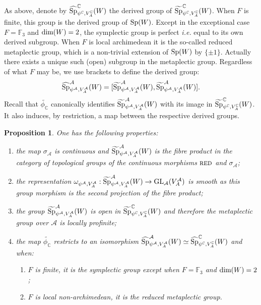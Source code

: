 \documentclass[11pt]{article}
\theoremstyle{plain}
\newtheorem{prop}[theo]{Proposition}
\theoremstyle{definition}
\theoremstyle{plain}
\theoremstyle{definition}
\theoremstyle{plain}
\begin{document}
As above, denote by $\widehat{\textup{Sp}}_{\psi^\mathbb{C},V_A^\mathbb{C}}^\mathbb{C}(W)$ the derived group of $\widetilde{\textup{Sp}}_{\psi^\mathbb{C},V_A^\mathbb{C}}^\mathbb{C}(W)$. When $F$ is finite, this group is the derived group of $\textup{Sp}(W)$. Except in the exceptional case $F=\mathbb{F}_3$ and $\textup{dim} (W)=2$, the symplectic group is perfect \textit{i.e.} equal to its own derived subgroup. When $F$ is local archimedean it is the so-called reduced metaplectic group, which is a non-trivial extension of $\textup{Sp}(W)$ by $\{ \pm 1 \}$. Actually there exists a unique such (open) subgroup in the metaplectic group. Regardless of what $F$ may be, we use brackets to define the derived group:
$$\widehat{\textup{Sp}}_{\psi^\mathcal{A},V_A^\mathcal{A}}^\mathcal{A}(W) = [\widetilde{\textup{Sp}}_{\psi^\mathcal{A},V_A^\mathcal{A}}^\mathcal{A}(W),\widetilde{\textup{Sp}}_{\psi^\mathcal{A},V_A^\mathcal{A}}^\mathcal{A}(W)].$$
Recall that $\widetilde{\phi_\mathbb{C}}$ canonically identifies $\widetilde{\textup{Sp}}_{\psi^\mathcal{A},V_A^\mathcal{A}}^\mathcal{A}(W)$ with its image in $\widetilde{\textup{Sp}}_{\psi^\mathbb{C},V_A^\mathbb{C}}^\mathbb{C}(W)$. It also induces, by restriction, a map between the respective derived groups.

\begin{prop} \label{metaplectic_group_over_A_prop} One has the following properties:
\begin{enumerate}[label=\textup{\alph*)}]
\item the map $\sigma_\mathcal{A}$ is continuous and $\widetilde{\textup{Sp}}_{\psi^\mathcal{A},V_A^\mathcal{A}}^\mathcal{A}(W)$ is the fibre product in the category of topological groups of the continuous morphisms $\textup{\textsc{red}}$ and $\sigma_\mathcal{A}$;
\item the representation $\omega_{\psi^\mathcal{A},V_A^\mathcal{A}} : \widetilde{\textup{Sp}}_{\psi^\mathcal{A},V_A^\mathcal{A}}^\mathcal{A}(W)  \to \textup{GL}_\mathcal{A}(V_A^\mathcal{A})$ is smooth as this group morphism is the second projection of the fibre product;
\item the group $\widetilde{\textup{Sp}}_{\psi^\mathcal{A},V_A^\mathcal{A}}^\mathcal{A}(W)$ is open in $\widetilde{\textup{Sp}}_{\psi^\mathbb{C},V_A^\mathbb{C}}^\mathbb{C}(W)$ and therefore the metaplectic group over $\mathcal{A}$ is locally profinite;
\item the map $\widetilde{\phi_\mathbb{C}}$ restricts to an isomorphism $\widehat{\textup{Sp}}_{\psi^\mathcal{A},V_A^\mathcal{A}}^\mathcal{A}(W) \simeq \widehat{\textup{Sp}}_{\psi^\mathbb{C},V_A^\mathbb{C}}^\mathbb{C}(W)$ and when:
\begin{enumerate} \item[\textup{i)}] $F$ is finite, it is the symplectic group except when $F =\mathbb{F}_3$ and $\textup{dim}(W)=2$;
\item[\textup{ii)}] $F$ is local non-archimedean, it is the reduced metaplectic group. \end{enumerate} 
\end{enumerate} \end{prop}
\end{document}
